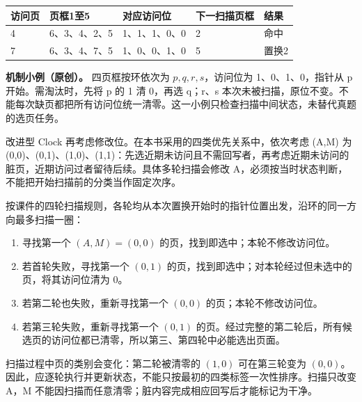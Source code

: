 \begin{wideblock}\par\medskip\noindent\begin{minipage}{\linewidth}\fontsize{9.3}{12}\selectfont\begin{tabularx}{\linewidth}{@{}YYYYY@{}}
\toprule\noalign{}
访问页 & 页框1至5 & 对应访问位 & 下一扫描页框 & 结果 \\
\midrule\noalign{}


4 & 6、3、4、2、5 & 1、1、1、0、0 & 2 & 命中 \\
7 & 6、3、4、7、5 & 1、0、0、1、0 & 5 & 置换2 \\
\bottomrule\end{tabularx}
\end{minipage}\par\medskip\end{wideblock}

\textbf{机制小例（原创）。} 四页框按环依次为 \(p,q,r,s\)，访问位为 1、0、1、0，指针从 p 开始。需淘汰时，先将 p 的 1 清 0，再选 q；r、s 本次未被扫描，原位不变。不能每次缺页都把所有访问位统一清零。这一小例只检查扫描中间状态，未替代真题的选页任务。

改进型 Clock 再考虑修改位。在本书采用的四类优先关系中，依次考虑 (A,M) 为 (0,0)、(0,1)、(1,0)、(1,1)：先选近期未访问且不需回写者，再考虑近期未访问的脏页，近期访问过者留待后续。具体多轮扫描会修改 A，必须按当时状态判断，不能把开始扫描前的分类当作固定次序。

按课件的四轮扫描规则，各轮均从本次置换开始时的指针位置出发，沿环的同一方向最多扫描一圈：

\begin{enumerate}
\def\labelenumi{\arabic{enumi}.}
\tightlist
\item
  寻找第一个 \((A,M)=(0,0)\) 的页，找到即选中；本轮不修改访问位。
\item
  若首轮失败，寻找第一个 \((0,1)\) 的页，找到即选中；对本轮经过但未选中的页，将其访问位清为 0。
\item
  若第二轮也失败，重新寻找第一个 \((0,0)\) 的页；本轮不修改访问位。
\item
  若第三轮失败，重新寻找第一个 \((0,1)\) 的页。经过完整的第二轮后，所有候选页的访问位都已清零，所以第三、第四轮中必能选出页面。
\end{enumerate}

扫描过程中页的类别会变化：第二轮被清零的 \((1,0)\) 可在第三轮变为 \((0,0)\)。因此，应逐轮执行并更新状态，不能只按最初的四类标签一次性排序。扫描只改变 A，M 不能因扫描而任意清零；脏内容完成相应回写后才能标记为干净。

